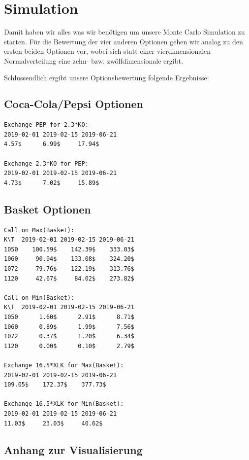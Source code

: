 \documentclass[12pt]{article}
\begin{document}
\pagebreak

\section*{Simulation}

Damit haben wir alles was wir benötigen um unsere Monte Carlo Simulation zu starten.
Für die Bewertung der vier anderen Optionen gehen wir analog zu den ersten beiden Optionen vor, wobei sich statt einer vierdimensionalen Normalverteilung eine zehn- bzw. zwölfdimensionale ergibt.



	Schlussendlich ergibt unsere Optionsbewertung folgende Ergebnisse:
\subsection*{Coca-Cola/Pepsi Optionen}

\begin{verbatim}
Exchange PEP for 2.3*KO:
2019-02-01 2019-02-15 2019-06-21
4.57$      6.99$     17.94$ 

Exchange 2.3*KO for PEP:
2019-02-01 2019-02-15 2019-06-21
4.73$      7.02$     15.89$
\end{verbatim}


\subsection*{Basket Optionen}



\begin{verbatim}
Call on Max(Basket):
K\T  2019-02-01 2019-02-15 2019-06-21
1050    100.59$    142.39$    333.03$ 
1060     90.94$    133.08$    324.20$ 
1072     79.76$    122.19$    313.76$ 
1120     42.67$     84.02$    273.82$ 

Call on Min(Basket):
K\T  2019-02-01 2019-02-15 2019-06-21
1050      1.60$      2.91$      8.71$ 
1060      0.89$      1.99$      7.56$ 
1072      0.37$      1.20$      6.34$ 
1120      0.00$      0.10$      2.79$ 

Exchange 16.5*XLK for Max(Basket):
2019-02-01 2019-02-15 2019-06-21
109.05$    172.37$    377.73$ 

Exchange 16.5*XLK for Min(Basket):
2019-02-01 2019-02-15 2019-06-21
11.03$     23.03$     40.62$ 
\end{verbatim}
\subsection*{Anhang zur Visualisierung}
\end{document}
